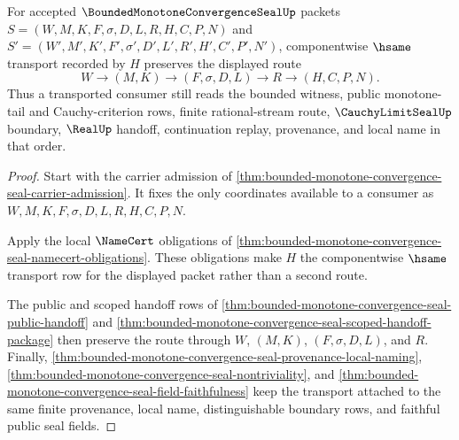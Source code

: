 \begin{theorem}
\label{thm:bounded-monotone-convergence-seal-stability-envelope}
For accepted $\BoundedMonotoneConvergenceSealUp$ packets $S=(W,M,K,F,\sigma,D,L,R,H,C,P,N)$ and $S'=(W',M',K',F',\sigma',D',L',R',H',C',P',N')$, componentwise $\hsame$ transport recorded by $H$ preserves the displayed route
$$
W \to (M,K) \to (F,\sigma,D,L) \to R \to (H,C,P,N).
$$
Thus a transported consumer still reads the bounded witness, public monotone-tail and Cauchy-criterion rows, finite rational-stream route, $\CauchyLimitSealUp$ boundary, $\RealUp$ handoff, continuation replay, provenance, and local name in that order.
\end{theorem}
\begin{proof}
Start with the carrier admission of \autoref{thm:bounded-monotone-convergence-seal-carrier-admission}. It fixes the only coordinates available to a consumer as $W,M,K,F,\sigma,D,L,R,H,C,P,N$.

Apply the local $\NameCert$ obligations of \autoref{thm:bounded-monotone-convergence-seal-namecert-obligations}. These obligations make $H$ the componentwise $\hsame$ transport row for the displayed packet rather than a second route.

The public and scoped handoff rows of \autoref{thm:bounded-monotone-convergence-seal-public-handoff} and \autoref{thm:bounded-monotone-convergence-seal-scoped-handoff-package} then preserve the route through $W$, $(M,K)$, $(F,\sigma,D,L)$, and $R$. Finally, \autoref{thm:bounded-monotone-convergence-seal-provenance-local-naming}, \autoref{thm:bounded-monotone-convergence-seal-nontriviality}, and \autoref{thm:bounded-monotone-convergence-seal-field-faithfulness} keep the transport attached to the same finite provenance, local name, distinguishable boundary rows, and faithful public seal fields.
\end{proof}

